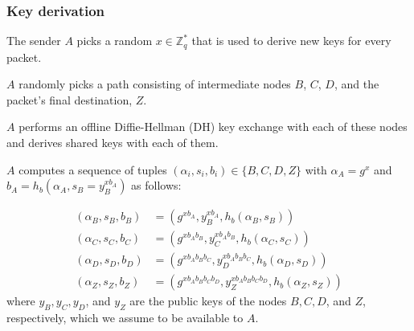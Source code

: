 \subsubsection{Key derivation}
\label{sec:sphinx:keyderivation}

The sender $A$ picks a random $x\in \mathbb{Z}^*_q$ that is used to derive new keys for every packet.

$A$ randomly picks a path consisting of intermediate nodes $B$, $C$, $D$, and the packet's final destination, $Z$.

$A$ performs an offline Diffie-Hellman (DH) key exchange with each of these nodes and derives shared keys with each of them.

$A$ computes a sequence of tuples $(\alpha_i,s_i,b_i) \in \{ B, C, D, Z \}$ with $\alpha_A = g^x$ and $b_A = h_b(\alpha_A, s_B = y_B^{x b_A})$ as follows:

\begin{align*}
    (\alpha_B,s_B,b_B) & = (g^{x b_A},y_B^{x b_A},h_b(\alpha_B,s_B))                         \\
    (\alpha_C,s_C,b_C) & = (g^{x b_A b_B},y_C^{x b_A b_B},h_b(\alpha_C,s_C))                 \\
    (\alpha_D,s_D,b_D) & = (g^{x b_A b_B b_C},y_D^{x b_A b_B b_C},h_b(\alpha_D,s_D))         \\
    (\alpha_Z,s_Z,b_Z) & = (g^{x b_A b_B b_C b_D},y_Z^{x b_A b_B b_C b_D},h_b(\alpha_Z,s_Z))
\end{align*}
where $y_B, y_C, y_D$, and $y_Z$ are the public keys of the nodes $B, C, D$, and $Z$, respectively, which we assume to be available to $A$.

